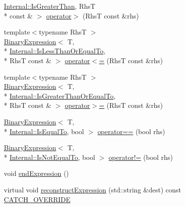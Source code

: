 \begin{DoxyCompactItemize}
\hyperlink{namespaceCatch_1_1Internal_ae3f96598a7858155750bf38e7295d83eac0e8866139e99803d169595af70f6c22}{Internal\-::\-Is\-Greater\-Than}, Rhs\-T \\*
const \& $>$ \hyperlink{classCatch_1_1ExpressionLhs_a52981d92ec6aad872660ae7df1abb33a}{operator$>$} (Rhs\-T const \&rhs)
\item 
{\footnotesize template$<$typename Rhs\-T $>$ }\\\hyperlink{classCatch_1_1BinaryExpression}{Binary\-Expression}$<$ T, \\*
\hyperlink{namespaceCatch_1_1Internal_ae3f96598a7858155750bf38e7295d83ea0db29a4c3f1e81260036c5e27a8407fd}{Internal\-::\-Is\-Less\-Than\-Or\-Equal\-To}, \\*
Rhs\-T const \& $>$ \hyperlink{classCatch_1_1ExpressionLhs_a1d10974a581c67cc400cd6cdd36b0000}{operator$<$=} (Rhs\-T const \&rhs)
\item 
{\footnotesize template$<$typename Rhs\-T $>$ }\\\hyperlink{classCatch_1_1BinaryExpression}{Binary\-Expression}$<$ T, \\*
\hyperlink{namespaceCatch_1_1Internal_ae3f96598a7858155750bf38e7295d83ead2de7e9565e59e36c0987e402203ce1c}{Internal\-::\-Is\-Greater\-Than\-Or\-Equal\-To}, \\*
Rhs\-T const \& $>$ \hyperlink{classCatch_1_1ExpressionLhs_a3387a494cb6b699a6c0162c79f7f533c}{operator$>$=} (Rhs\-T const \&rhs)
\item 
\hyperlink{classCatch_1_1BinaryExpression}{Binary\-Expression}$<$ T, \\*
\hyperlink{namespaceCatch_1_1Internal_ae3f96598a7858155750bf38e7295d83ea30e0accba6ec8384f4383b04dd2a6a9e}{Internal\-::\-Is\-Equal\-To}, bool $>$ \hyperlink{classCatch_1_1ExpressionLhs_ab803185079504a65b0af95f7c9669351}{operator==} (bool rhs)
\item 
\hyperlink{classCatch_1_1BinaryExpression}{Binary\-Expression}$<$ T, \\*
\hyperlink{namespaceCatch_1_1Internal_ae3f96598a7858155750bf38e7295d83ea1e1699cf7d3dbee0908f1a123da2456d}{Internal\-::\-Is\-Not\-Equal\-To}, bool $>$ \hyperlink{classCatch_1_1ExpressionLhs_a1f3ff934880623f12a4cbd9725397ccf}{operator!=} (bool rhs)
\item 
void \hyperlink{classCatch_1_1ExpressionLhs_a13d2551a927790284fb5ddf1ee2c9079}{end\-Expression} ()
\item 
virtual void \hyperlink{classCatch_1_1ExpressionLhs_a7684a053e8e88a4be475a536252630da}{reconstruct\-Expression} (std\-::string \&dest) const \hyperlink{catch_8hpp_a8ecdce4d3f57835f707915ae831eb847}{C\-A\-T\-C\-H\-\_\-\-O\-V\-E\-R\-R\-I\-D\-E}
\end{DoxyCompactItemize}


